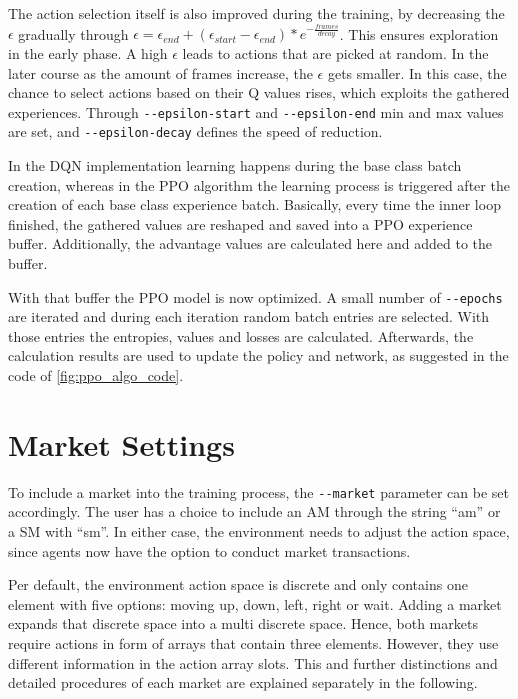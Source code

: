 The action selection itself is also improved during the training, by decreasing the $\epsilon$ gradually through $\epsilon = \epsilon_{end}+(\epsilon_{start}-\epsilon_{end})*e^{-\frac{frames}{decay}}$. This ensures exploration in the early phase. A high $\epsilon$ leads to actions that are picked at random. In the later course as the amount of frames increase, the $\epsilon$ gets smaller. In this case, the chance to select actions based on their Q values rises, which exploits the gathered experiences. Through \verb|--epsilon-start| and \verb|--epsilon-end| min and max values are set, and \verb|--epsilon-decay| defines the speed of reduction.

In the DQN implementation learning happens during the base class batch creation, whereas in the PPO algorithm the learning process is triggered after the creation of each base class experience batch. Basically, every time the inner loop finished, the gathered values are reshaped and saved into a PPO experience buffer. Additionally, the advantage values are calculated here and added to the buffer.

With that buffer the PPO model is now optimized. A small number of \verb|--epochs| are iterated and during each iteration random batch entries are selected. With those entries the entropies, values and losses are calculated. Afterwards, the calculation results are used to update the policy and network, as suggested in the code of \ref{fig:ppo_algo_code}.

\section{Market Settings}\label{market_settings}
To include a market into the training process, the \verb|--market| parameter can be set accordingly. The user has a choice to include an AM through the string ``am'' or a SM with ``sm''. In either case, the environment needs to adjust the action space, since agents now have the option to conduct market transactions.

Per default, the environment action space is discrete and only contains one element with five options: moving up, down, left, right or wait. Adding a market expands that discrete space into a multi discrete space. Hence, both markets require actions in form of arrays that contain three elements. However, they use different information in the action array slots. This and further distinctions and detailed procedures of each market are explained separately in the following.

